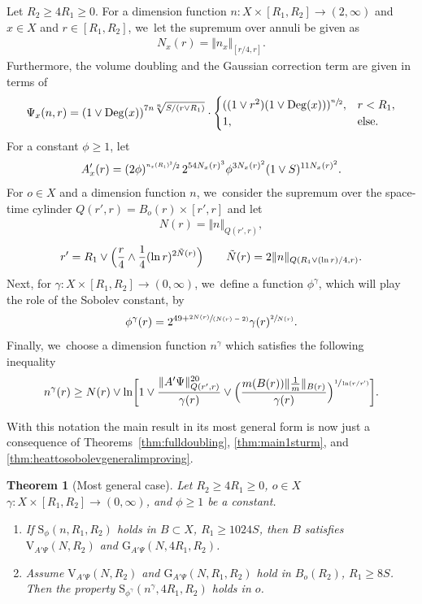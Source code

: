 \documentclass[JEP,XML,SOM,Unicode,published]{cedram}
\newenvironment{enumeratei}
{\bgroup\def\theenumi{\roman{enumi}}\def\theenumii{\arabic{enumii}}\begin{enumerate}}
{\end{enumerate}\egroup}
\newcommand{\spfrac}[2]{\sfrac{#1}{(#2)}}
\newcommand{\rG}{\mathrm{G}}
\newcommand{\rS}{\mathrm{S}}
\newcommand{\rV}{\mathrm{V}}
\theoremstyle{plain}
\newtheorem{theorem}{Theorem}[section]
\theoremstyle{definition}
\DeclareMathOperator{\Deg}{Deg}
\begin{document}
Let $R_{2}\ge {4}R_1\geq0$. For a dimension function $n\colon X\times [R_1,R_2]\to (2,\infty)$ and $ x\in X $ and $ r\in [R_{1},R_2] $, we~let the supremum over annuli be given as
\begin{align*}
N_x(r)=\Vert n_x\Vert_{[r/4,r]}.
\end{align*}
Furthermore, the volume doubling and the Gaussian correction term are given in terms of
\[
\Psi_x(n,r)
=\left(1\vee\Deg(x)\right)^{7n\sqrt[n]{S/(r\vee R_1)}}
\cdot \begin{cases}
((1\vee r^2)(1\vee \Deg(x)))^{\sfrac{n}{2}},& r<R_1,
\\
1,& \text{else.}
\end{cases}
\]
For a constant $ \phi\ge 1$, let
\[
A_x'(r)
=(2\phi)^{\sfrac{n_x(R_1)^2}{2}}\, 2^{54N_x(r)^3}\phi^{3N_x(r)^2}(1\vee S)^{11N_x(r)^2}.
\]
For $o\in X$ and a dimension function $ n $, we~consider the supremum over the space-time cylinder
$ Q(r',r)=B_o(r)\times [r',r] $ and let
\begin{align*}
N(r)=\Vert n\Vert_{Q(r',r)},
\end{align*}
\[
r'= R_1\vee\Bigl( \frac{r}{4}\wedge \frac{1}{4}(\ln r)^{2\tilde N(r)}\Bigr)\qquad {\tilde N(r)=2\|n\|_{Q(R_1\vee (\ln r)/4,r)}}.
\]
Next, for
$\gamma\colon X\times [R_1,R_2]\to (0,\infty)$, we~define a function $ \phi^{\gamma} $, which will play the role of the Sobolev constant, by
\begin{equation*}
\phi^{\gamma}(r)=2^{{49}+\spfrac{2N(r)}{N(r)-2}}\gamma(r)^{\sfrac{2}{N(r)}}.
\end{equation*}
Finally, we~choose a dimension function $ n^{\gamma}$ which satisfies the following inequality
\begin{align*}
n^{\gamma}(r)\geq N(r)\vee \ln\biggl[1\vee
\frac{{\Vert A'\Psi\Vert_{Q(r',r)}^{20}}}{\gamma(r)}\vee \Bigl(\frac{m(B(r))\Vert \tfrac1m\Vert_{B(r)}}{\gamma(r)}\Bigr)^{\sfrac{1}{\ln(r/r')}}
\biggr].
\end{align*}

With this notation the main result in its most general form is now just a consequence of Theorems~\ref{thm:fulldoubling}, \ref{thm:main1sturm}, and \ref{thm:heattosobolevgeneralimproving}.

\begin{theorem}[Most general case]\label{thm:general}Let
$ R_2\geq {4}R_1\geq 0$, {$o\in X$} $\gamma\colon X\times [R_1,R_2]\to (0,\infty)$, and $ \phi\ge 1$ be a constant.
\begin{enumeratei}
\item If $\rS_\phi (n,R_1,R_2)$ holds in $B\subset X$, $R_1\geq 1024S$, then
$B$ satisfies $\rV_{\!A'{\Psi}}(N,R_2)$ and $\rG_{A'\Psi}(N,4R_1,R_2)$.
\item
Assume $\rV_{\!A'{\Psi}} (N,R_2)$ and $\rG_{A'\Psi}(N,R_1,R_2)$ hold in $B_o(R_2)$, $R_1\geq 8S$. Then the property $\rS_{\phi^{\gamma}}(n^{\gamma},4 R_1,R_2)$ holds in $o$.
\end{enumeratei}
\end{theorem}
\end{document}
